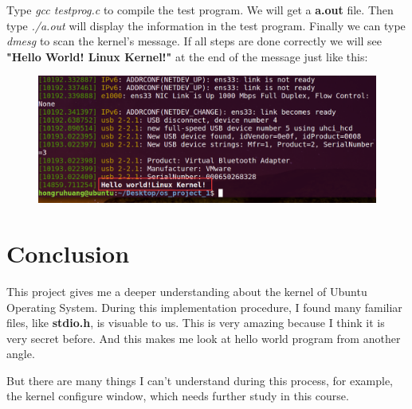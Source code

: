\documentclass[12pt]{article}
\begin{document}
Type \emph{gcc testprog.c} to compile the test program. We will get a \textbf{a.out} file. Then type \emph{./a.out} will display the information in the test program. Finally we can type \emph{dmesg} to scan the kernel's message. If all steps are done correctly we will see \textbf{"Hello World! Linux Kernel!"} at the end of the message just like this:
\begin{figure}
	\centering
	\includegraphics[scale=0.35]{result.png}
\end{figure}

\section{Conclusion}
This project gives me a deeper understanding about the kernel of Ubuntu Operating System. During this implementation procedure, I found many familiar files, like \textbf{stdio.h}, is visuable to us. This is very amazing because I think it is very secret before. And this makes me look at hello world program from another angle.

But there are many things I can't understand during this process, for example, the kernel configure window, which needs further study in this course.
\end{document}
